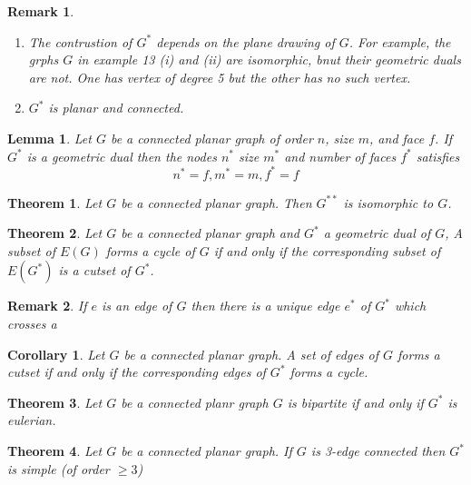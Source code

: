 \documentclass[12pt]{article}
\newtheorem{theorem}{Theorem}
\newtheorem*{corollary}{Corollary}
\newtheorem*{lemma}{Lemma}
\newtheorem*{remark}{Remark}
\begin{document}
\begin{remark}
  \begin{enumerate}
    \item The contrustion of $G^{*}$ depends on the plane drawing of $G$. For example, the grphs $G$ in example 13 (i) and (ii) are isomorphic, bnut their geometric duals are not.  One has vertex of degree 5 but the other has no such vertex.
    \item $G^{*}$ is planar and connected.
  \end{enumerate}
\end{remark}


\begin{lemma}
  Let $G$ be a connected planar graph of order $n$, size $m$, and face $f$. If $G^{*}$ is a geometric dual then the nodes $n^{*}$ size $m^{*}$ and number of faces $f^{*}$ satisfies
  \[n^{*} = f, m^{*} = m, f^{*} =f\]
\end{lemma}


\begin{theorem}
Let $G$ be a connected planar graph. Then $G^{**}$ is isomorphic to $G$.
\end{theorem}

\begin{theorem}
Let $G$ be a connected planar graph and $G^{*}$ a geometric dual of $G$, A subset of $E(G)$ forms a cycle of $G$ if and only if the corresponding subset of $E(G^{*})$ is a cutset of $G^{*}$.
\end{theorem}

\begin{remark}
If $e$ is an edge of $G$ then there is a unique edge $e^{*}$ of $G^{*}$ which crosses a
\end{remark}





\begin{corollary}
Let $G$ be a connected planar graph. A set of edges of $G$ forms a cutset if and only if the corresponding edges of $G^{*}$ forms a cycle.
\end{corollary}

\begin{theorem}
Let $G$ be a connected planr graph $G$ is bipartite if and only if $G^{*}$ is eulerian.
\end{theorem}


\begin{theorem}
Let $G$ be a connected planar graph. If $G$ is 3-edge connected then $G^{*}$ is simple (of order $\ge 3$)
\end{theorem}
\end{document}
